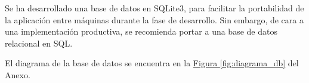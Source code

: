 Se ha desarrollado una base de datos en SQLite3\cite{sqlite}, para facilitar la portabilidad de la aplicación entre máquinas durante la fase de desarrollo. Sin embargo, de cara a una implementación productiva, se recomienda portar a una base de datos relacional en SQL.

El diagrama de la base de datos se encuentra en la \hyperref[fig:diagrama_db]{Figura \ref{fig:diagrama_db}} del Anexo.